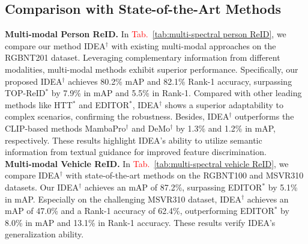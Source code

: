 \subsection{Comparison with State-of-the-Art Methods}
\textbf{Multi-modal Person ReID.}
In \textcolor{red}{Tab.}~\ref{tab:multi-spectral person ReID}, we compare our method IDEA$^\dagger$ with existing multi-modal approaches on the RGBNT201 dataset. 
%
Leveraging complementary information from different modalities, multi-modal methods exhibit superior performance.
%
Specifically, our proposed IDEA$^\dagger$ achieves 80.2\% mAP and 82.1\% Rank-1 accuracy, surpassing TOP-ReID$^*$ by 7.9\% in mAP and 5.5\% in Rank-1. 
%
Compared with other leading methods like HTT$^*$ and EDITOR$^*$, IDEA$^\dagger$ shows a superior adaptability to complex scenarios, confirming the robustness.
%
Besides, IDEA$^\dagger$ outperforms the CLIP-based methods MambaPro$^\dagger$ and DeMo$^\dagger$ by 1.3\% and 1.2\% in mAP, respectively.
%
These results highlight IDEA’s ability to utilize semantic information from textual guidance for improved feature discrimination. 
\\
\textbf{Multi-modal Vehicle ReID.}
In \textcolor{red}{Tab.}~\ref{tab:multi-spectral vehicle ReID}, we compare IDEA$^\dagger$ with state-of-the-art methods on the RGBNT100 and MSVR310 datasets.
%
Our IDEA$^\dagger$ achieves an mAP of 87.2\%, surpassing EDITOR$^*$ by 5.1\% in mAP.
%
Especially on the challenging MSVR310 dataset, IDEA$^\dagger$ achieves an mAP of 47.0\% and a Rank-1 accuracy of 62.4\%, outperforming EDITOR$^*$ by 8.0\% in mAP and 13.1\% in Rank-1 accuracy.
%
These results verify IDEA's generalization ability.

